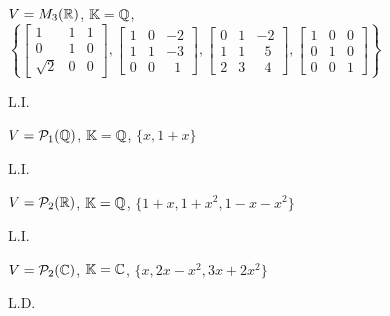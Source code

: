 \documentclass[12pt]{exam}
\begin{document}
    \begin{exercicio}
        $V = M_3(\mathbb{R})$, $\mathbb{K} = \mathbb{Q}$,
        $
            \left\{
                \begin{bmatrix}
                    1 & 1 & 1\\
                    0 & 1 & 0\\
                    \sqrt{2} & 0 & 0
                \end{bmatrix},
                \begin{bmatrix}
                    1 & 0 & -2\\
                    1 & 1 & -3\\
                    0 & 0 & \phantom{x} 1
                \end{bmatrix},
                \begin{bmatrix}
                    0 & 1 & -2\\
                    1 & 1 & \phantom{x} 5\\
                    2 & 3 & \phantom{x} 4
                \end{bmatrix},
                \begin{bmatrix}
                    1 & 0 & 0\\
                    0 & 1 & 0\\
                    0 & 0 & 1
                \end{bmatrix}
            \right\}
        $
        \begin{solucao}
            L.I.
        \end{solucao}
    \end{exercicio}

    \begin{exercicio}
        $V = \mathcal{P}_1(\mathbb{Q})$, $\mathbb{K} = \mathbb{Q}$, $\{x, 1 + x\}$
        \begin{solucao}
            L.I.
        \end{solucao}
    \end{exercicio}

    \begin{exercicio}
        $V = \mathcal{P}_2(\mathbb{R})$, $\mathbb{K} = \mathbb{Q}$, $\{1 + x, 1 + x^2, 1 - x - x^2\}$
        \begin{solucao}
            L.I.
        \end{solucao}
    \end{exercicio}

    \begin{exercicio}
        $V = \mathcal{P}_2(\mathbb{C})$, $\mathbb{K} = \mathbb{C}$, $\{x, 2x - x^2, 3x + 2x^2\}$
        \begin{solucao}
            L.D.
        \end{solucao}
    \end{exercicio}
\end{document}
